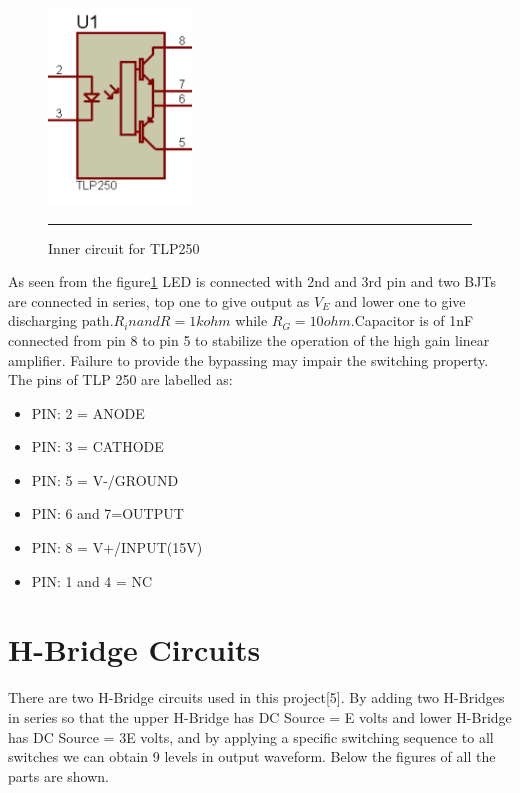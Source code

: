 \begin{figure}[htbp]
	\centering
		\includegraphics[width = 1.5in]{./Figures/tlp250.pdf}
		\rule{35em}{1pt}
	\caption{Inner circuit for TLP250}
	\label{fig:4}
\end{figure}
As seen from the figure\ref{fig:4} LED is connected with 2nd and 3rd pin and two BJTs are connected in series, top one to give output as $V_E$ and lower one to give discharging path.$R_in and R =1kohm $ while $R_G=10ohm$.Capacitor is of 1nF connected from pin 8 to pin 5 to stabilize the operation of the high gain linear amplifier. Failure to provide the bypassing may impair the switching property.
The pins of TLP 250 are labelled as:
\begin{itemize}
\item PIN: 2 = ANODE
\item PIN: 3 = CATHODE
\item PIN: 5 = V-/GROUND
\item PIN: 6 and 7=OUTPUT
\item PIN: 8 = V+/INPUT(15V)
\item PIN: 1 and 4 = NC
\end{itemize}
\section{H-Bridge Circuits}
There are two H-Bridge circuits used in this project[5]. By adding two H-Bridges in series so that the upper H-Bridge has DC Source = E volts and lower H-Bridge has DC Source = 3E volts, and by applying a specific switching sequence to all  switches we can obtain 9 levels in output waveform. Below the figures of all the parts are shown.

